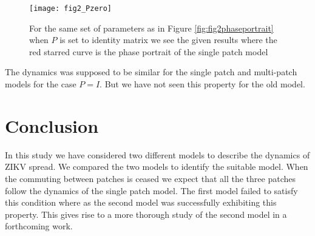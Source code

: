 \documentclass{article}
\begin{document}
\begin{figure}[H]
	\centering
	\texttt{[image: fig2\_Pzero]}
	\caption{For the same set of parameters as in Figure \ref{fig:fig2phaseportrait} when $P$ is set to identity matrix we see the given results where the red starred curve is the phase portrait of the single patch model}
	\label{fig:fig2pzero}
\end{figure}
The dynamics was supposed to be similar for the single patch and multi-patch models for the case $P=I$. But we have not seen this property for the old model.
\section{Conclusion}
In this study we have considered two different models to describe the dynamics of ZIKV spread. We compared the two models to identify the suitable model. When the commuting between patches is ceased we expect that all the three patches follow the dynamics of the single patch model. The first model failed to satisfy this condition where as the second model was successfully exhibiting this property. This gives rise to a more thorough study of the second model in a forthcoming work.%
%
\end{document}
